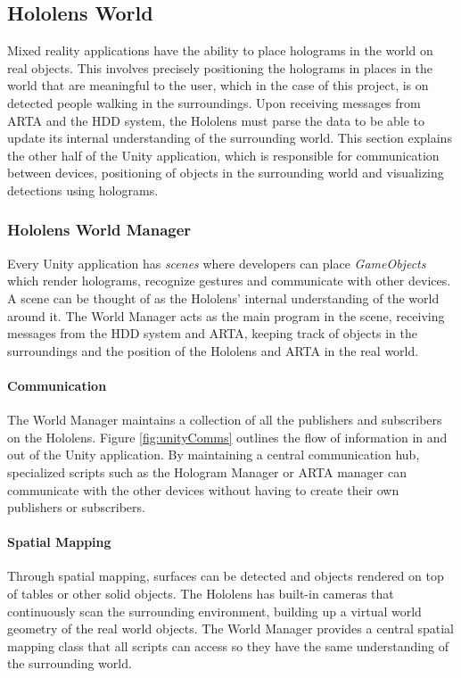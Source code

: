\subsection{Hololens World}
Mixed reality applications have the ability to place holograms in the world on real objects. This involves precisely positioning the holograms in places in the world that are meaningful to the user, which in the case of this project, is on detected people walking in the surroundings. Upon receiving messages from ARTA and the HDD system, the Hololens must parse the data to be able to update its internal understanding of the surrounding world. This section explains the other half of the Unity application, which is responsible for communication between devices, positioning of objects in the surrounding world and visualizing detections using holograms.

\subsubsection{Hololens World Manager} \label{sec:holoworld}
Every Unity application has \textit{scenes} where developers can place \textit{GameObjects} which render holograms, recognize gestures and communicate with other devices. A scene can be thought of as the Hololens' internal understanding of the world around it. The World Manager acts as the main program in the scene, receiving messages from the HDD system and ARTA, keeping track of objects in the surroundings and the position of the Hololens and ARTA in the real world.

\paragraph{Communication} The World Manager maintains a collection of all the publishers and subscribers on the Hololens. Figure \ref{fig:unityComms} outlines the flow of information in and out of the Unity application. By maintaining a central communication hub, specialized scripts such as the Hologram Manager or ARTA manager can communicate with the other devices without having to create their own publishers or subscribers.

\paragraph{Spatial Mapping} Through spatial mapping, surfaces can be detected and objects rendered on top of tables or other solid objects. The Hololens has built-in cameras that continuously scan the surrounding environment, building up a virtual world geometry of the real world objects. The World Manager provides a central spatial mapping class that all scripts can access so they have the same understanding of the surrounding world.


